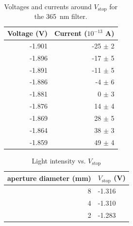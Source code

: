 \documentclass{article}
\begin{document}
\begin{table}[]
\centering
\caption{Voltages and currents around $V_\text{stop}$ for the \qty{365}{nm} filter.}
\begin{tabular}{@{}rr@{}}
\toprule
\multicolumn{1}{l}{Voltage (V)} & \multicolumn{1}{l}{Current ($10^{-13}$ A)} \\ \midrule
-1.901                          & -25   $\pm$ 2                                                                \\
-1.896                          & -17   $\pm$ 5                                                                \\
-1.891                          & -11   $\pm$ 5                                                                \\
-1.886                          & -4    $\pm$ 6                                                                \\
-1.881                          & 0     $\pm$ 3                                                                \\
-1.876                          & 14    $\pm$ 4                                                                \\
-1.869                          & 28    $\pm$ 5                                                                \\
-1.864                          & 38    $\pm$ 3                                                                \\
-1.859                          & 49    $\pm$ 4                                                                \\ \bottomrule
\end{tabular}
\label{tab:samplevstopvsf}
\end{table}

\begin{figure}
    \centering
    \def\svgwidth{\linewidth}
    
    \caption{}
    \label{fig:vstopvsf}
\end{figure}

\begin{table}[]
    \centering
    \caption{Light intensity vs. $V_\text{stop}$}
\begin{tabular}{@{}rl@{}}
\toprule
aperture diameter (mm) & $V_\text{stop}$ (V) \\ \midrule
8                                          & -1.316                               \\
4                                          & -1.310                                \\
2                                          & -1.283                               \\ \bottomrule
\end{tabular}
\label{tab:vstopvsint}
\end{table}
\end{document}
